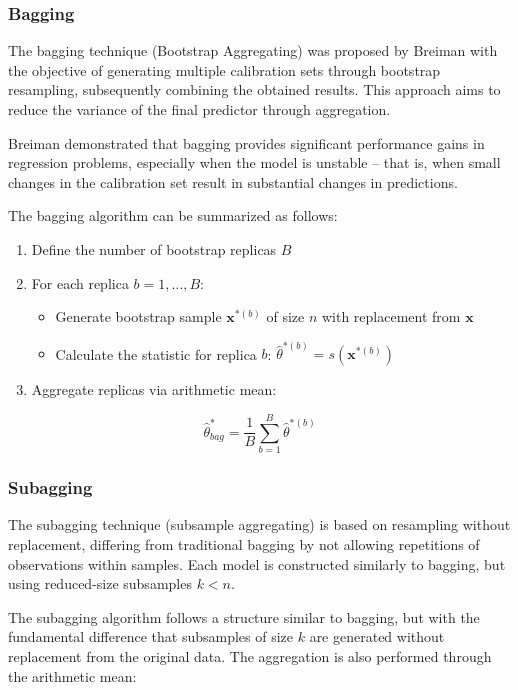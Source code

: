 \documentclass[12pt]{article}
\begin{document}
\subsubsection{Bagging}

The bagging technique (Bootstrap Aggregating) was proposed by Breiman\cite{Breiman1996} with the objective of generating multiple calibration sets through bootstrap resampling, subsequently combining the obtained results. This approach aims to reduce the variance of the final predictor through aggregation.

Breiman demonstrated that bagging provides significant performance gains in regression problems, especially when the model is unstable – that is, when small changes in the calibration set result in substantial changes in predictions.\cite{Shabbir2024, HONG2020}

The bagging algorithm can be summarized as follows:

\begin{enumerate}
\item Define the number of bootstrap replicas $B$
\item For each replica $b = 1, \ldots, B$:
   \begin{itemize}
   \item Generate bootstrap sample $\mathbf{x}^{*(b)}$ of size $n$ with replacement from $\mathbf{x}$
   \item Calculate the statistic for replica $b$: $\hat{\theta}^{*(b)} = s(\mathbf{x}^{*(b)})$
   \end{itemize}
\item Aggregate replicas via arithmetic mean:
\end{enumerate}

\begin{equation}
\hat{\theta}^*_{bag} = \frac{1}{B}\sum_{b=1}^{B}\hat{\theta}^{*(b)}
\end{equation}

\subsubsection{Subagging}

The subagging technique (subsample aggregating) is based on resampling without replacement, differing from traditional bagging by not allowing repetitions of observations within samples.\cite{Buhlmann2003} Each model is constructed similarly to bagging, but using reduced-size subsamples $k < n$.

The subagging algorithm follows a structure similar to bagging, but with the fundamental difference that subsamples of size $k$ are generated without replacement from the original data. The aggregation is also performed through the arithmetic mean:
\end{document}
